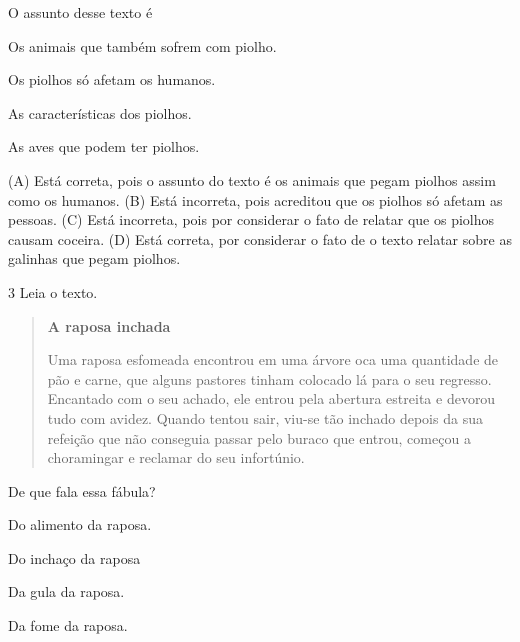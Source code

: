 
O assunto desse texto é

\begin{escolha}
\item Os animais que também sofrem com piolho.

\item Os piolhos só afetam os humanos.

\item As características dos piolhos.

\item As aves que podem ter piolhos.
\end{escolha}


(A) Está correta, pois o assunto do texto é os animais que pegam piolhos
assim como os humanos.
(B) Está incorreta, pois acreditou que os piolhos só afetam as pessoas.
(C) Está incorreta, pois por considerar o fato de relatar que os piolhos
causam coceira.
(D) Está correta, por considerar o fato de o texto relatar sobre as
galinhas que pegam piolhos.

\num{3} Leia o texto.

\begin{quote}
\textbf{A raposa inchada}

Uma raposa esfomeada encontrou em uma árvore oca uma quantidade de pão e
carne, que alguns pastores tinham colocado lá para o seu regresso.
Encantado com o seu achado, ele entrou pela abertura estreita e devorou
tudo com avidez. Quando tentou sair, viu-se tão inchado depois da sua
refeição que não conseguia passar pelo buraco que entrou, começou a
choramingar e reclamar do seu infortúnio.
\end{quote}


De que fala essa fábula?

\begin{escolha}
\item Do alimento da raposa.

\item Do inchaço da raposa

\item Da gula da raposa.

\item Da fome da raposa.
\end{escolha}

